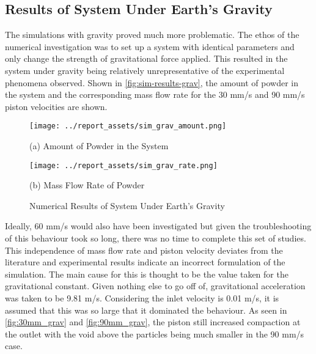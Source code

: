\subsection{Results of System Under Earth's Gravity}
The simulations with gravity proved much more problematic. The ethos of the numerical investigation was to set up a system with identical parameters and only change the strength of gravitational force applied. This resulted in the system under gravity being relatively unrepresentative of the experimental phenomena observed. Shown in \autoref{fig:sim-results-grav}, the amount of powder in the system and the corresponding mass flow rate for the 30 mm/s and 90 mm/s piston velocities are shown.
\begin{figure}[htbp]
    \centering

    \begin{minipage}{0.45\textwidth}
        \centering
        \texttt{[image: ../report\_assets/sim\_grav\_amount.png]}
        \caption*{(a) Amount of Powder in the System}
    \end{minipage}    
    \hfill
    \begin{minipage}{0.45\textwidth}
        \centering
        \texttt{[image: ../report\_assets/sim\_grav\_rate.png]}
        \caption*{(b) Mass Flow Rate of Powder}
    \end{minipage}    
    \caption{Numerical Results of System Under Earth's Gravity}\label{fig:sim-results-grav}

\end{figure} 
Ideally, 60 mm/s would also have been investigated but given the troubleshooting of this behaviour took so long, there was no time to complete this set of studies. This independence of mass flow rate and piston velocity deviates from the literature and experimental results indicate an incorrect formulation of the simulation. The main cause for this is thought to be the value taken for the gravitational constant. Given nothing else to go off of, gravitational acceleration was taken to be 9.81 m/s. Considering the inlet velocity is 0.01 m/s, it is assumed that this was so large that it dominated the behaviour. As seen in \autoref{fig:30mm_grav} and \autoref{fig:90mm_grav}, the piston still increased compaction at the outlet with the void above the particles being much smaller in the 90 mm/s case.

